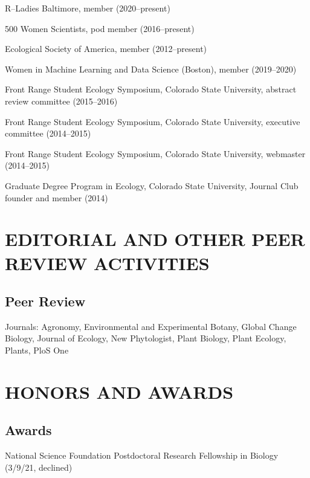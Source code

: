 \documentclass{cv}
\begin{document}
R--Ladies Baltimore, member (2020--present)

500 Women Scientists, pod member (2016--present)

Ecological Society of America, member (2012--present)

Women in Machine Learning and Data Science (Boston), member (2019--2020)

Front Range Student Ecology Symposium, Colorado State University, abstract review committee (2015--2016)

Front Range Student Ecology Symposium, Colorado State University, executive committee (2014--2015)

Front Range Student Ecology Symposium, Colorado State University, webmaster (2014--2015)

Graduate Degree Program in Ecology, Colorado State University, Journal Club founder and member (2014)


\section*{EDITORIAL AND OTHER PEER REVIEW ACTIVITIES}

\subsection*{Peer Review}

Journals: Agronomy, Environmental and Experimental Botany, Global Change Biology, Journal of Ecology, New Phytologist, Plant Biology, Plant Ecology, Plants, PloS One


\section*{HONORS AND AWARDS}

\subsection*{Awards}
	
National Science Foundation Postdoctoral Research Fellowship in Biology (3/9/21, declined) %
\end{document}
